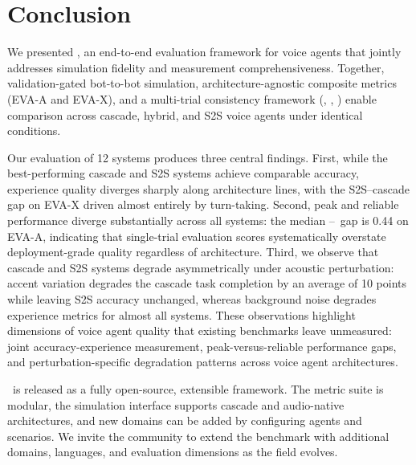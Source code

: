 \section{Conclusion}
We presented \framework, an end-to-end evaluation framework for voice agents that jointly addresses simulation fidelity and measurement comprehensiveness. Together, validation-gated bot-to-bot simulation, architecture-agnostic composite metrics (EVA-A and EVA-X), and a multi-trial consistency framework (\passatone, \passatk, \passpowerk) enable comparison across cascade, hybrid, and S2S voice agents under identical conditions.

Our evaluation of 12 systems produces three central findings. First, while the best-performing cascade and S2S systems achieve comparable accuracy, experience quality diverges sharply along architecture lines,  with the S2S--cascade gap on EVA-X driven almost entirely by turn-taking. Second, peak and reliable performance diverge substantially across all systems: the median \passatk--\passpowerk~gap is 0.44 on EVA-A, indicating that single-trial evaluation scores systematically overstate deployment-grade quality regardless of architecture. Third, we observe that cascade and S2S systems degrade asymmetrically under acoustic perturbation: accent variation degrades the cascade task completion by an average of 10 points while leaving S2S accuracy unchanged, whereas background noise degrades experience metrics for almost all systems. These observations highlight dimensions of voice agent quality that existing benchmarks leave unmeasured: joint accuracy-experience measurement, peak-versus-reliable performance gaps, and perturbation-specific degradation patterns across voice agent architectures. 

\framework~is released as a fully open-source, extensible framework. The metric 
suite is modular, the simulation interface supports cascade and audio-native 
architectures, and new domains can be added by configuring agents and scenarios. We invite the community to extend the benchmark with additional domains, languages, and evaluation dimensions as the field evolves.
